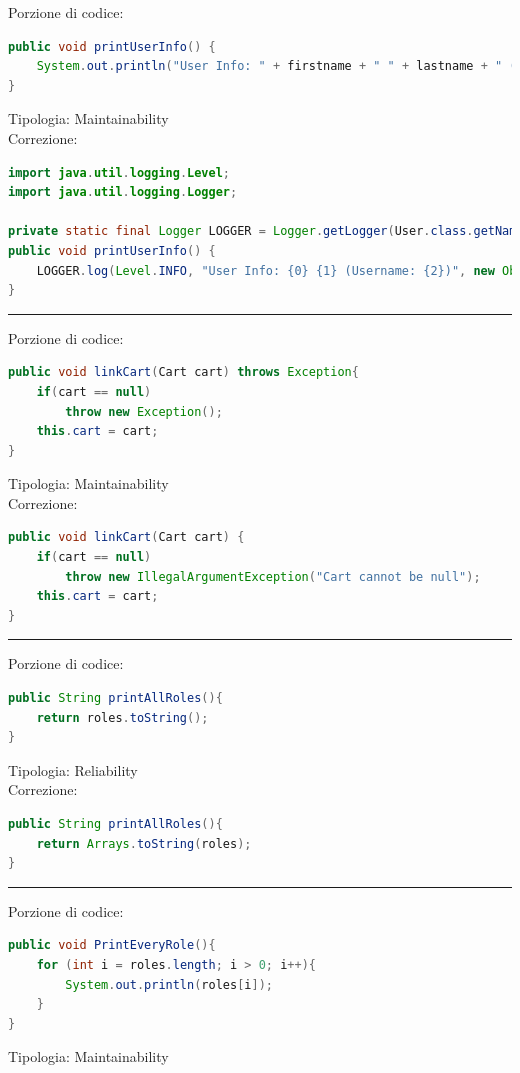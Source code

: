 \documentclass{article}
\begin{document}
Porzione di codice:
\begin{lstlisting}[language=Java]
public void printUserInfo() {
    System.out.println("User Info: " + firstname + " " + lastname + " (Username: " + username + ")");
}
\end{lstlisting}
Tipologia: Maintainability\\
Correzione:
\begin{lstlisting}[language=Java]
import java.util.logging.Level;
import java.util.logging.Logger;

private static final Logger LOGGER = Logger.getLogger(User.class.getName());
public void printUserInfo() {
    LOGGER.log(Level.INFO, "User Info: {0} {1} (Username: {2})", new Object[]{firstname, lastname, username});
}
\end{lstlisting}
\vspace{.5em}\hrule\vspace{.5em}
Porzione di codice:
\begin{lstlisting}[language=Java]
public void linkCart(Cart cart) throws Exception{
    if(cart == null)
        throw new Exception();
    this.cart = cart;
}
\end{lstlisting}
Tipologia: Maintainability\\
Correzione:
\begin{lstlisting}[language=Java]
public void linkCart(Cart cart) {
    if(cart == null)
        throw new IllegalArgumentException("Cart cannot be null");
    this.cart = cart;
}
\end{lstlisting}
\vspace{.5em}\hrule\vspace{.5em}
Porzione di codice:
\begin{lstlisting}[language=Java]
public String printAllRoles(){
    return roles.toString();
}
\end{lstlisting}
Tipologia: Reliability\\
Correzione:
\begin{lstlisting}[language=Java]
public String printAllRoles(){
    return Arrays.toString(roles);
}
\end{lstlisting}
\vspace{.5em}\hrule\vspace{.5em}
Porzione di codice:
\begin{lstlisting}[language=Java]
public void PrintEveryRole(){
    for (int i = roles.length; i > 0; i++){
        System.out.println(roles[i]);
    }
}
\end{lstlisting}
Tipologia: Maintainability\\
\end{document}
